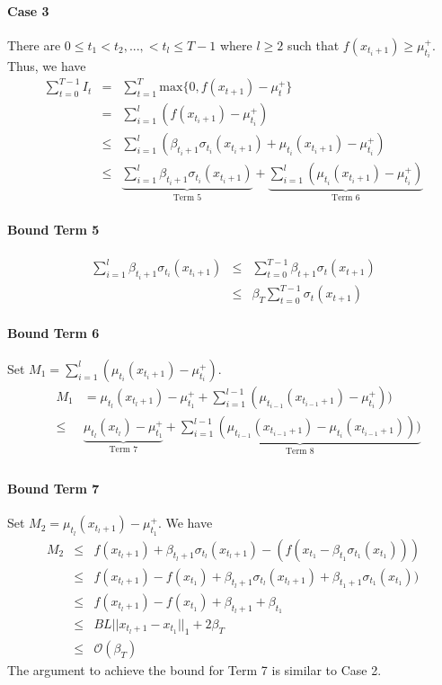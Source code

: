 \documentclass[twoside]{article}
\begin{document}
\paragraph{Case 3} There are $0 \le t_1 < t_2, ..., < t_l \le T-1$ where $l \ge 2$ such that $f(x_{t_i +1}) \ge \mu_{t_i}^+$. Thus, we have
\begin{eqnarray*}
\sum_{t=0}^{T-1} I_t & = & \sum_{t=1}^{T} \text{max}\{0, f(x_{t+1}) - \mu_t^+\} \\
& = & \sum_{i = 1}^{l} (f(x_{t_i +1}) - \mu_{t_i}^+) \\
& \le & \sum_{i = 1}^{l} (\beta_{t_i+1} \sigma_{t_i}(x_{t_i +1}) + \mu_{t_i}(x_{t_i +1}) - \mu_{t_i}^+) \\
& \le & \underbrace{\sum_{i = 1}^{l} \beta_{t_i+1} \sigma_{t_i}(x_{t_i +1})}_{\text{Term 5}} +  \underbrace{\sum_{i = 1}^{l}(\mu_{t_i}(x_{t_i +1}) - \mu_{t_i}^+)}_{\text{Term 6}}
\end{eqnarray*}
\paragraph{Bound Term 5}
\begin{eqnarray*}
\sum_{i = 1}^{l} \beta_{t_i+1} \sigma_{t_i}(x_{t_i +1}) & \le & \sum_{t=0}^{T-1} \beta_{t+1} \sigma_{t}(x_{t+1}) \\
& \le &  \beta_T \sum_{t=0}^{T-1} \sigma_{t}(x_{t+1})
\end{eqnarray*}
\paragraph{Bound Term 6} Set $M_1 = \sum_{i = 1}^{l}(\mu_{t_i}(x_{t_i +1}) - \mu_{t_i}^+)$.
\begin{eqnarray*}
& M_1 & =\mu_{t_l}(x_{t_l +1}) - \mu_{t_1}^+  + \sum_{i=1}^{l-1} (\mu_{t_{i-1}}(x_{t_{i-1} +1}) - \mu_{t_i}^+))\\
&\le & \underbrace{\mu_{t_l}(x_{t_l}) - \mu_{t_1}^+}_{\text{Term 7}}  + \underbrace{\sum_{i=1}^{l-1} (\mu_{t_{i-1}}(x_{t_{i-1} +1}) - \mu_{t_i}(x_{t_{i-1} +1})))}_{\text{Term 8}}\\
\end{eqnarray*}
\paragraph{Bound Term 7} Set $M_2 = \mu_{t_l}(x_{t_l+1}) - \mu_{t_1}^+ $. We have
\begin{eqnarray*}
M_2 & \le & f(x_{t_l + 1}) + \beta_{t_l+1}\sigma_{t_l}(x_{t_l+1}) - (f(x_{t_1} - \beta_{t_1}\sigma_{t_1}(x_{t_1}))) \\
& \le &  f(x_{t_l + 1}) - f(x_{t_1}) + \beta_{t_l+1}\sigma_{t_l}(x_{t_l+1})+ \beta_{t_1 +1}\sigma_{t_1}(x_{t_1})) \\
& \le & f(x_{t_l + 1}) - f(x_{t_1}) + \beta_{t_l +1}  + \beta_{t_1}  \\
& \le & BL||x_{t_l + 1} - x_{t_1}||_1 + 2\beta_T  \\
& \le & \mathcal O(\beta_T)
\end{eqnarray*}
The argument to achieve the bound for Term 7 is similar to Case 2.
\end{document}
